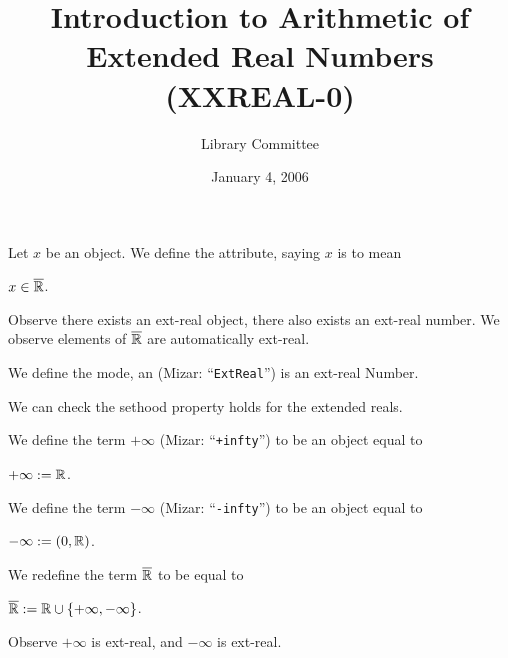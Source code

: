\documentclass{article}
\title{Introduction to Arithmetic of Extended Real Numbers (XXREAL-0)}
\author{Library Committee}
\date{January 4, 2006}
\begin{document}
\maketitle

\begin{definition}
Let $x$ be an object.
We define the attribute, saying $x$ is  to mean
\begin{defn}
\item $x\in\overline{\mathbb{R}}$.
\end{defn}
\end{definition}

Observe there exists an ext-real object, there also exists an ext-real
number. We observe elements of $\overline{\mathbb{R}}$ are automatically ext-real.

\begin{definition}
We define the mode, an  (Mizar: ``\verb#ExtReal#'') is an ext-real Number.
\end{definition}

We can check the sethood property holds for the extended reals.

\begin{definition}\index{$+\infty$}%
We define the term $+\infty$ (Mizar: ``\verb#+infty#'') to be an object
equal to
\begin{defn}
\item $+\infty := \mathbb{R}$.
\end{defn}
We define the term $-\infty$ (Mizar: ``\verb#-infty#'') to be an object
equal to
\begin{defn}
\item $-\infty := (0,\mathbb{R})$.
\end{defn}
\end{definition}

\begin{definition}
We redefine the term $\overline{\mathbb{R}}$ to be equal to
\begin{defn}
\item $\overline{\mathbb{R}} := \mathbb{R}\cup\{+\infty,-\infty\}$.
\end{defn}
\end{definition}

Observe $+\infty$ is ext-real, and $-\infty$ is ext-real.
\end{document}
